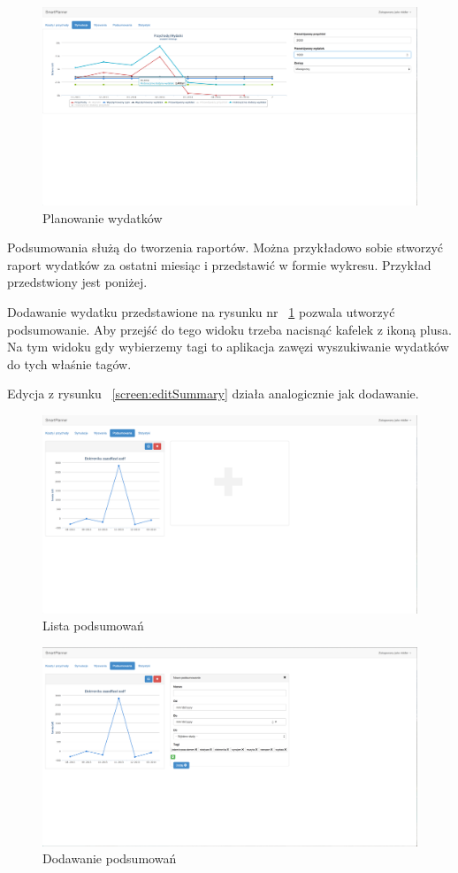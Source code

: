 \documentclass[10pt,titlepage]{article}
\begin{document}
\begin{figure}[H]
  \centering
  \includegraphics[scale=0.2]{images/screen_planowanieWydatkow.png}
  \caption{Planowanie wydatków}
\end{figure}
\par Podsumowania służą do tworzenia raportów. Można przykładowo sobie stworzyć raport wydatków za ostatni miesiąc i przedstawić w formie wykresu. Przykład przedstwiony jest poniżej.
\par Dodawanie wydatku przedstawione na rysunku nr ~\ref{screen:addSummary} pozwala utworzyć podsumowanie. Aby przejść do tego widoku trzeba nacisnąć kafelek z ikoną plusa. Na tym widoku gdy wybierzemy tagi to aplikacja zawęzi wyszukiwanie wydatków do tych właśnie tagów.
\par Edycja z rysunku ~\ref{screen:editSummary} działa analogicznie jak dodawanie.
\begin{figure}[H]
  \centering
  \includegraphics[scale=0.2]{images/screen_podsumowania.png}
  \caption{Lista podsumowań}
\end{figure}
\begin{figure}[H]
  \centering
  \includegraphics[scale=0.2]{images/screen_podsumowaniaDodaj.png}
  \caption{Dodawanie podsumowań}
  \label{screen:addSummary}
\end{figure}
\end{document}
